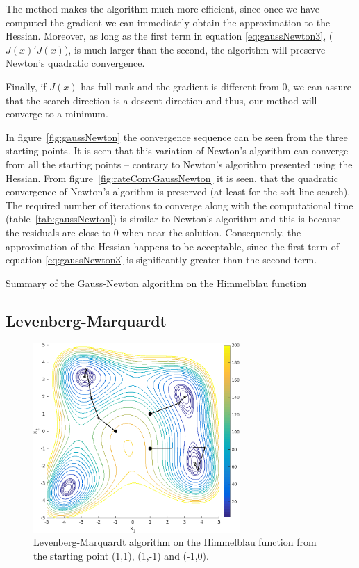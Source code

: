 The method makes the algorithm much more efficient, since once we have computed the gradient we can immediately obtain the approximation to the Hessian. Moreover, as long as the first term in equation \ref{eq:gaussNewton3}, ($J(x)'J(x)$), is much larger than the second, the algorithm will preserve Newton's quadratic convergence.

Finally, if $J(x)$ has full rank and the gradient is different from 0, we can assure that the search direction is a descent direction and thus, our method will converge to a minimum.

In figure~\ref{fig:gaussNewton} the convergence sequence can be seen from the three starting points. It is seen that this variation of Newton's algorithm can converge from all the starting points -- contrary to Newton's algorithm presented using the Hessian. From figure~\ref{fig:rateConvGaussNewton} it is seen, that the quadratic convergence of Newton's algorithm is preserved (at least for the soft line search). The required number of iterations to converge along with the computational time (table~\ref{tab:gaussNewton}) is similar to Newton's algorithm and this is because the residuals are close to 0 when near the solution. Consequently, the approximation of the Hessian happens to be acceptable, since the first term of equation \ref{eq:gaussNewton3} is significantly greater than the second term.

\begin{table}[H]
\centering

\caption{Summary of the Gauss-Newton algorithm on the Himmelblau function}
\label{tab:gaussNewton}
\end{table}

\subsection{Levenberg-Marquardt}

\begin{figure}[htb]
\centering
\includegraphics[width=0.7\textwidth]{../img/LM}
\caption{Levenberg-Marquardt algorithm on the Himmelblau function from the starting point (1,1), (1,-1) and (-1,0).}
\label{fig:LM}
\end{figure}

